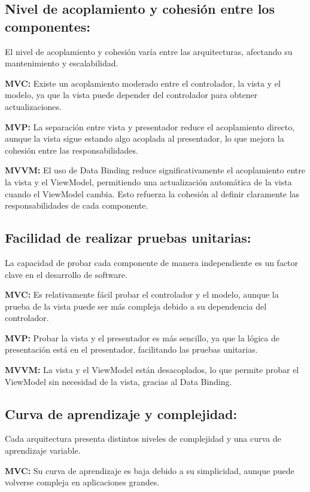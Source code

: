 \documentclass[letterpaper, 12pt]{report}
\begin{document}
\subsection{Nivel de acoplamiento y cohesión entre los componentes:}

El nivel de acoplamiento y cohesión varía entre las arquitecturas, afectando su mantenimiento y escalabilidad.

\textbf{MVC:} Existe un acoplamiento moderado entre el controlador, la vista y el modelo, ya que la vista puede depender del controlador para obtener actualizaciones.

\textbf{MVP:} La separación entre vista y presentador reduce el acoplamiento directo, aunque la vista sigue estando algo acoplada al presentador, lo que mejora la cohesión entre las responsabilidades.

\textbf{MVVM:} El uso de Data Binding reduce significativamente el acoplamiento entre la vista y el ViewModel, permitiendo una actualización automática de la vista cuando el ViewModel cambia. Esto refuerza la cohesión al definir claramente las responsabilidades de cada componente.

\subsection{Facilidad de realizar pruebas unitarias:}

La capacidad de probar cada componente de manera independiente es un factor clave en el desarrollo de software.

\textbf{MVC:} Es relativamente fácil probar el controlador y el modelo, aunque la prueba de la vista puede ser más compleja debido a su dependencia del controlador.

\textbf{MVP:} Probar la vista y el presentador es más sencillo, ya que la lógica de presentación está en el presentador, facilitando las pruebas unitarias.

\textbf{MVVM:} La vista y el ViewModel están desacoplados, lo que permite probar el ViewModel sin necesidad de la vista, gracias al Data Binding.

\subsection{Curva de aprendizaje y complejidad:}

Cada arquitectura presenta distintos niveles de complejidad y una curva de aprendizaje variable.

\textbf{MVC:} Su curva de aprendizaje es baja debido a su simplicidad, aunque puede volverse compleja en aplicaciones grandes.
\end{document}
